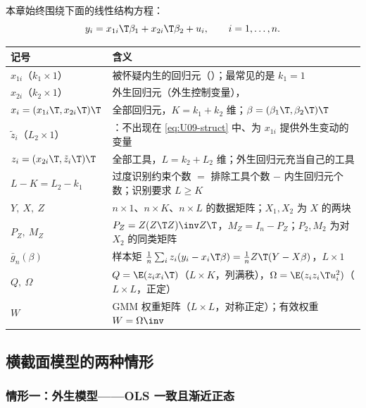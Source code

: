 本章始终围绕下面的线性结构方程：
\begin{equation}\label{eq:U09-struct}
y_i=x_{1i}\T\beta_1+x_{2i}\T\beta_2+u_i ,\qquad i=1,\dots,n .
\end{equation}
\begin{center}
\small
\begin{tabularx}{\linewidth}{lL}
\toprule
记号 & 含义\\
\midrule
$x_{1i}$（$k_1\times1$） & 被怀疑内生的回归元（）；最常见的是 $k_1=1$\\
$x_{2i}$（$k_2\times1$） & 外生回归元（外生控制变量），\\
$x_i=(x_{1i}\T,x_{2i}\T)\T$ & 全部回归元，$K=k_1+k_2$ 维；$\beta=(\beta_1\T,\beta_2\T)\T$\\
$\tilde z_i$（$L_2\times1$） & ：不出现在 \eqref{eq:U09-struct} 中、为 $x_{1i}$ 提供外生变动的变量\\
$z_i=(x_{2i}\T,\tilde z_i\T)\T$ & 全部工具，$L=k_2+L_2$ 维；外生回归元充当自己的工具\\
$L-K=L_2-k_1$ & 过度识别约束个数 $=$ 排除工具个数 $-$ 内生回归元个数；识别要求 $L\ge K$\\
$Y,\ X,\ Z$ & $n\times1$、$n\times K$、$n\times L$ 的数据矩阵；$X_1,X_2$ 为 $X$ 的两块\\
$P_Z,\ M_Z$ & $P_Z=Z(Z\T Z)\inv Z\T$，$M_Z=I_n-P_Z$；$P_2,M_2$ 为对 $X_2$ 的同类矩阵\\
$\bar g_n(\beta)$ & 样本矩 $\frac1n\sum_i z_i(y_i-x_i\T\beta)=\frac1n Z\T(Y-X\beta)$，$L\times1$\\
$Q,\ \Omega$ & $Q=\E(z_ix_i\T)$（$L\times K$，列满秩），$\Omega=\E(z_iz_i\T u_i^2)$（$L\times L$，正定）\\
$W$ & GMM 权重矩阵（$L\times L$，对称正定）；有效权重 $W=\Omega\inv$\\
\bottomrule
\end{tabularx}
\end{center}

\subsection{横截面模型的两种情形}

\subsubsection{情形一：外生模型——OLS 一致且渐近正态}


